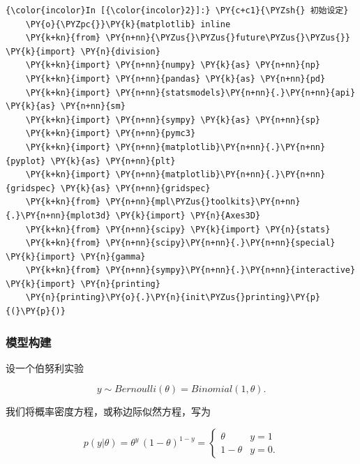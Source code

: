 \begin{Verbatim}[commandchars=\\\{\}]
{\color{incolor}In [{\color{incolor}2}]:} \PY{c+c1}{\PYZsh{} 初始设定}
    \PY{o}{\PYZpc{}}\PY{k}{matplotlib} inline
    \PY{k+kn}{from} \PY{n+nn}{\PYZus{}\PYZus{}future\PYZus{}\PYZus{}} \PY{k}{import} \PY{n}{division}
    \PY{k+kn}{import} \PY{n+nn}{numpy} \PY{k}{as} \PY{n+nn}{np}
    \PY{k+kn}{import} \PY{n+nn}{pandas} \PY{k}{as} \PY{n+nn}{pd}
    \PY{k+kn}{import} \PY{n+nn}{statsmodels}\PY{n+nn}{.}\PY{n+nn}{api} \PY{k}{as} \PY{n+nn}{sm}
    \PY{k+kn}{import} \PY{n+nn}{sympy} \PY{k}{as} \PY{n+nn}{sp}
    \PY{k+kn}{import} \PY{n+nn}{pymc3}
    \PY{k+kn}{import} \PY{n+nn}{matplotlib}\PY{n+nn}{.}\PY{n+nn}{pyplot} \PY{k}{as} \PY{n+nn}{plt}
    \PY{k+kn}{import} \PY{n+nn}{matplotlib}\PY{n+nn}{.}\PY{n+nn}{gridspec} \PY{k}{as} \PY{n+nn}{gridspec}
    \PY{k+kn}{from} \PY{n+nn}{mpl\PYZus{}toolkits}\PY{n+nn}{.}\PY{n+nn}{mplot3d} \PY{k}{import} \PY{n}{Axes3D}
    \PY{k+kn}{from} \PY{n+nn}{scipy} \PY{k}{import} \PY{n}{stats}
    \PY{k+kn}{from} \PY{n+nn}{scipy}\PY{n+nn}{.}\PY{n+nn}{special} \PY{k}{import} \PY{n}{gamma}
    \PY{k+kn}{from} \PY{n+nn}{sympy}\PY{n+nn}{.}\PY{n+nn}{interactive} \PY{k}{import} \PY{n}{printing}
    \PY{n}{printing}\PY{o}{.}\PY{n}{init\PYZus{}printing}\PY{p}{(}\PY{p}{)}
\end{Verbatim}

%

\subsubsection{模型构建}
\label{ux6a21ux578bux6784ux5efa}
设一个伯努利实验

\begin{equation}
y \sim Bernoulli(\theta) = Binomial(1,\theta).
\end{equation}

我们将概率密度方程，或称边际似然方程，写为

\begin{equation}
p(y|\theta) = \theta^{y} \, \left(1-\theta \right)^{1-y} = \begin{cases}
\theta & y = 1 \\
1 - \theta & y = 0.
\end{cases}
\end{equation}

